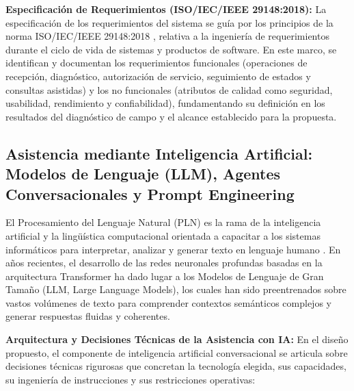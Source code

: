 \textbf{Especificación de Requerimientos (ISO/IEC/IEEE 29148:2018):} La especificación de los requerimientos del sistema se guía por los principios de la norma ISO/IEC/IEEE 29148:2018 \cite{iso29148}, relativa a la ingeniería de requerimientos durante el ciclo de vida de sistemas y productos de software. En este marco, se identifican y documentan los requerimientos funcionales (operaciones de recepción, diagnóstico, autorización de servicio, seguimiento de estados y consultas asistidas) y los no funcionales (atributos de calidad como seguridad, usabilidad, rendimiento y confiabilidad), fundamentando su definición en los resultados del diagnóstico de campo y el alcance establecido para la propuesta.

\subsection{Asistencia mediante Inteligencia Artificial: Modelos de Lenguaje (LLM), Agentes Conversacionales y Prompt Engineering}

El Procesamiento del Lenguaje Natural (PLN) es la rama de la inteligencia artificial y la lingüística computacional orientada a capacitar a los sistemas informáticos para interpretar, analizar y generar texto en lenguaje humano \cite{russell2021}. En años recientes, el desarrollo de las redes neuronales profundas basadas en la arquitectura Transformer ha dado lugar a los Modelos de Lenguaje de Gran Tamaño (LLM, Large Language Models), los cuales han sido preentrenados sobre vastos volúmenes de texto para comprender contextos semánticos complejos y generar respuestas fluidas y coherentes.

\textbf{Arquitectura y Decisiones Técnicas de la Asistencia con IA:} En el diseño propuesto, el componente de inteligencia artificial conversacional se articula sobre decisiones técnicas rigurosas que concretan la tecnología elegida, sus capacidades, su ingeniería de instrucciones y sus restricciones operativas:

